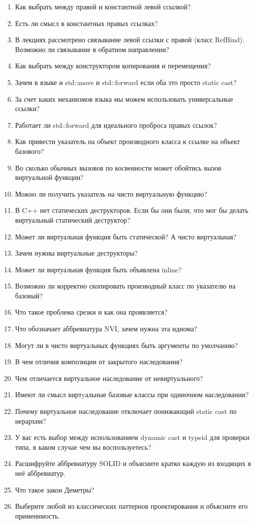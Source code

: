 \documentclass[a4paper,12pt,oneside]{article}
\begin{document}
\begin{enumerate}
\item Как выбрать между правой и константной левой ссылкой?
\item Есть ли смысл в константных правых ссылках?
\item В лекциях рассмотрено связывание левой ссылки с правой (класс RefBind). Возможно ли связывание в обратном направлении?
\item Как выбрать между конструктором копирования и перемещения?
\item Зачем в языке и std::move и std::forward если оба это просто static cast?
\item За счет каких механизмов языка мы можем использовать универсальные ссылки?
\item Работает ли std::forward для идеального проброса правых ссылок?
\item Как привести указатель на объект производного класса к ссылке на объект базового?
\item Во сколько обычных вызовов по косвенности может обойтись вызов виртуальной функции?
\item Можно ли получить указатель на чисто виртуальную функцию?
\item В C++ нет статических деструкторов. Если бы они были, что мог бы делать виртуальный статический деструктор?
\item Может ли виртуальная функция быть статической? А чисто виртуальная?
\item Зачем нужны виртуальные деструкторы?
\item Может ли виртуальная функция быть объявлена inline?
\item Возможно ли корректно скопировать производный класс по указателю на базовый?
\item Что такое проблема срезки и как она проявляется?
\item Что обозначает аббревиатура NVI, зачем нужна эта идиома?
\item Могут ли в чисто виртуальных функциях быть аргументы по умолчанию?
\item В чем отличия композиции от закрытого наследования?
\item Чем отличается виртуальное наследование от невиртуального?
\item Имеют ли смысл виртyальные базовые классы при одиночном наследовании?
\item Почему виртуальное наследование отключает понижающий static cast по иерархии?
\item У вас есть выбор между использованием dynamic cast и typeid для проверки типа, в каком случае чем вы воспользуетесь?
\item Расшифруйте аббревиатуру SOLID и объясните кратко каждую из входящих в неё аббревиатур.
\item Что такое закон Деметры?
\item Выберите любой из классических паттернов проектирования и объясните его применимость.
\end{enumerate}
\end{document}

